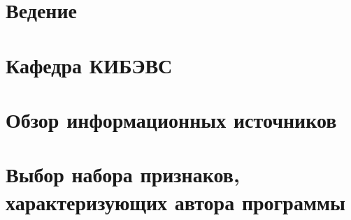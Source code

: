 


 
 
%  
 
 \newpage
 \tableofcontents

% 


\titleformat{\section}{\centering\normalfont\normalsize}{\thesection}{1.0em}{}
\titleformat{\subsection}{\centering\normalfont\normalsize}{\thesubsection}{1.0em}{}
\titleformat{\subsubsection}{\centering\normalfont\normalsize}{\thesubsection}{1.0em}{}


\newpage
{}
\setcounter{section}{0}
\section*{Ведение}


\newpage
\section{Кафедра КИБЭВС}



\newpage 
\section{Обзор информационных источников }


% 
% 

\newpage 
\section{Выбор набора признаков, характеризующих автора программы}\label{features}
 
 
